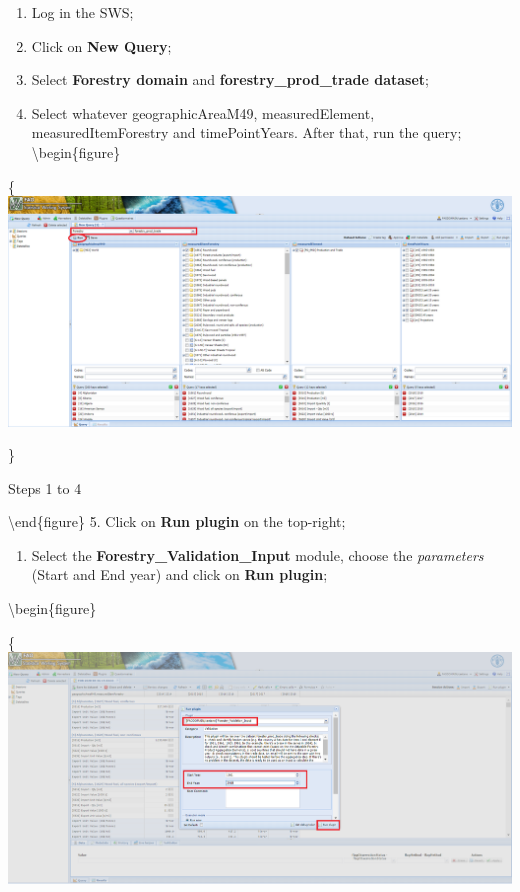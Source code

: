 \documentclass[
]{book}
\providecommand{\tightlist}{%
  \setlength{\itemsep}{0pt}\setlength{\parskip}{0pt}}
\begin{document}
\begin{enumerate}
\def\labelenumi{\arabic{enumi}.}
\item
  Log in the SWS;
\item
  Click on \textbf{New Query};
\item
  Select \textbf{Forestry domain} and \textbf{forestry\_prod\_trade dataset};
\item
  Select whatever geographicAreaM49, measuredElement, measuredItemForestry and timePointYears. After that, run the query;
  \textbackslash begin\{figure\}
\end{enumerate}

\{\centering \includegraphics[width=1\linewidth]{images/query_forestry_unece_itto_input_data_plugin}

\}

\caption{Steps 1 to 4}

\label{fig:queryForestryprodtrade}
\textbackslash end\{figure\}
5. Click on \textbf{Run plugin} on the top-right;

\begin{enumerate}
\def\labelenumi{\arabic{enumi}.}
\setcounter{enumi}{5}
\tightlist
\item
  Select the \textbf{Forestry\_Validation\_Input} module, choose the \emph{parameters} (Start and End year) and click on \textbf{Run plugin};
\end{enumerate}

\textbackslash begin\{figure\}

\{\centering \includegraphics[width=1\linewidth]{images/forestry_input_validation_plugin}
\end{document}
